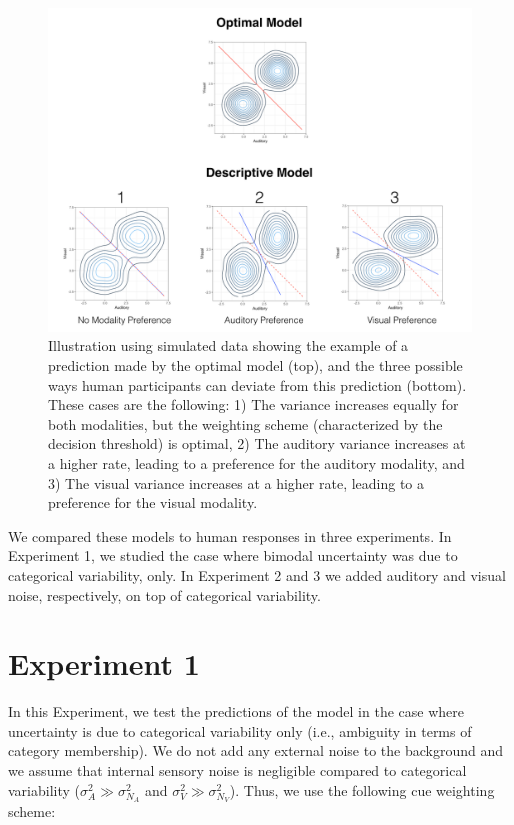 \documentclass[english,,man,floatsintext]{apa6}
\theoremstyle{definition}
\theoremstyle{definition}
\theoremstyle{definition}
\theoremstyle{remark}
\begin{document}
\begin{figure}[!h]
\includegraphics[width=\textwidth]{pictures/sub-optimal} \caption{Illustration using simulated data showing the example of a prediction made by the optimal model (top), and the three possible ways human participants can deviate from this prediction (bottom). These cases are the following: 1) The variance increases equally for both modalities, but the weighting scheme (characterized by the decision threshold) is optimal, 2) The auditory variance increases at a higher rate, leading to a preference for the auditory modality, and 3) The visual variance increases at a higher rate, leading to a preference for the visual modality.}\label{fig:subOptim}
\end{figure}

We compared these models to human responses in three experiments. In
Experiment 1, we studied the case where bimodal uncertainty was due to
categorical variability, only. In Experiment 2 and 3 we added auditory
and visual noise, respectively, on top of categorical variability.

\section{Experiment 1}\label{experiment-1}

In this Experiment, we test the predictions of the model in the case
where uncertainty is due to categorical variability only (i.e.,
ambiguity in terms of category membership). We do not add any external
noise to the background and we assume that internal sensory noise is
negligible compared to categorical variability
(\(\sigma^2_{A} \gg \sigma^2_{N_A}\) and
\(\sigma^2_{V} \gg \sigma^2_{N_V}\)). Thus, we use the following cue
weighting scheme:
\end{document}
